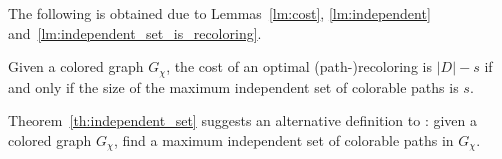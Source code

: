 The following is obtained due to  Lemmas~\ref{lm:cost}, 
\ref{lm:independent} and~\ref{lm:independent_set_is_recoloring}.

\begin{theorem}
\label{th:independent_set}
Given a colored graph $G_\chi$, the cost of an optimal
(path-)recoloring is $|D| - s$ if and only if the size of the maximum
independent set of colorable paths is $s$.
\end{theorem}

Theorem~\ref{th:independent_set} suggests an alternative definition to \TWOCR{}: 
given a colored graph $G_\chi$, 
find a maximum independent set of colorable paths in $G_\chi$.
